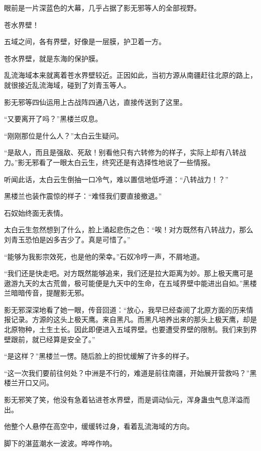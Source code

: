 
\begin{this_body}

眼前是一片深蓝色的大幕，几乎占据了影无邪等人的全部视野。

苍水界壁！

五域之间，各有界壁，好像是一层膜，护卫着一方。

苍水界壁，就是东海的保护膜。

乱流海域本来就离着苍水界壁较近。正因如此，当初方源从南疆赶往北原的路上，就很接近乱流海域，碰到了刘青玉等人。

影无邪等四仙运用上古战阵四通八达，直接传送到了这里。

“又要离开了吗？”黑楼兰叹息。

“刚刚那位是什么人？”太白云生疑问。

“是敌人，而且是强敌、死敌！别看他只有六转修为的样子，实际上却有八转战力。”影无邪看了一眼太白云生，终究还是有选择性地说了一些情报。

听闻此话，太白云生倒抽一口冷气，难以置信地低呼道：“八转战力！？”

黑楼兰也装作震惊的样子：“难怪我们要直接撤退。”

石奴始终面无表情。

太白云生忽然想到了什么，脸上涌起悲伤之色：“唉！对方既然有八转战力，那么刘青玉恐怕是凶多吉少了。真是可惜了。”

“能够为我影宗效死，也是他的荣幸。”石奴冷哼一声，不屑地道。

“我们还是快走吧。对方既然能够追来，我们还是拉大距离为妙。那上极天鹰可是遨游九天的太古荒兽，极可能便是九天中的生命，在五域界壁中能进出自如。”黑楼兰暗暗传音，提醒影无邪。

影无邪深深地看了她一眼，传音回道：“放心，我早已经查阅了北原方面的历来情报记录。方源的这头上极天鹰。来自黑凡。而黑凡培养出来的那头上极天鹰，却是北原物种，土生土长。因此即便进入五域界壁。也要遭受界壁的限制。我们来到界壁跟前，就已经算是安全了。”

“是这样？”黑楼兰一愣。随后脸上的担忧缓解了许多的样子。

“这一次我们要前往何处？中洲是不行的，难道是前往南疆，开始展开营救吗？”黑楼兰开口又问。

影无邪笑了笑，他没有急着钻进苍水界壁，而是调动仙元，浑身蛊虫气息洋溢而出。

他整个人悬停在高空中，缓缓转过身，看着乱流海域的方向。

脚下的湛蓝潮水一波波。哗哗作响。


\end{this_body}
